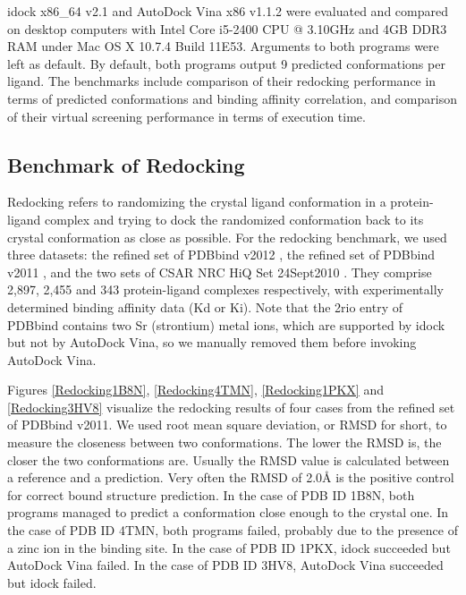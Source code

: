 \documentclass[10pt]{article}
\begin{document}
idock x86\_64 v2.1 and AutoDock Vina x86 v1.1.2 were evaluated and compared on desktop computers with Intel Core i5-2400 CPU @ 3.10GHz and 4GB DDR3 RAM under Mac OS X 10.7.4 Build 11E53. Arguments to both programs were left as default. By default, both programs output 9 predicted conformations per ligand. The benchmarks include comparison of their redocking performance in terms of predicted conformations and binding affinity correlation, and comparison of their virtual screening performance in terms of execution time.

\subsection*{Benchmark of Redocking}
Redocking refers to randomizing the crystal ligand conformation in a protein-ligand complex and trying to dock the randomized conformation back to its crystal conformation as close as possible. For the redocking benchmark, we used three datasets: the refined set of PDBbind v2012 \cite{529,530}, the refined set of PDBbind v2011 \cite{529,530}, and the two sets of CSAR NRC HiQ Set 24Sept2010 \cite{857,960}. They comprise 2,897, 2,455 and 343 protein-ligand complexes respectively, with experimentally determined binding affinity data (Kd or Ki). Note that the 2rio entry of PDBbind contains two Sr (strontium) metal ions, which are supported by idock but not by AutoDock Vina, so we manually removed them before invoking AutoDock Vina.

Figures \ref{Redocking1B8N}, \ref{Redocking4TMN}, \ref{Redocking1PKX} and \ref{Redocking3HV8} visualize the redocking results of four cases from the refined set of PDBbind v2011.  We used root mean square deviation, or RMSD for short, to measure the closeness between two conformations. The lower the RMSD is, the closer the two conformations are. Usually the RMSD value is calculated between a reference and a prediction. Very often the RMSD of 2.0Å is the positive control for correct bound structure prediction. In the case of PDB ID 1B8N, both programs managed to predict a conformation close enough to the crystal one. In the case of PDB ID 4TMN, both programs failed, probably due to the presence of a zinc ion in the binding site. In the case of PDB ID 1PKX, idock succeeded but AutoDock Vina failed. In the case of PDB ID 3HV8, AutoDock Vina succeeded but idock failed.
\end{document}

